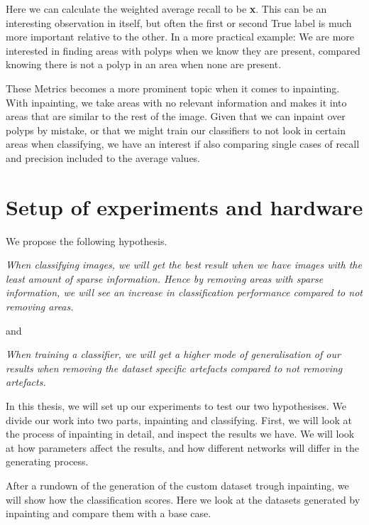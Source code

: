 Here we can calculate the weighted average recall to be \textbf{x}. This can be an interesting observation in itself, but often the first or second True label is much more important relative to the other.  In a more practical example: We are more interested in finding areas with polyps when we know they are present, compared knowing there is not a polyp in an area when none are present. 

These Metrics becomes a more prominent topic when it comes to inpainting. With inpainting, we take areas with no relevant information and makes it into areas that are similar to the rest of the image. Given that we can inpaint over polyps by mistake, or that we might train our classifiers to not look in certain areas when classifying, we have an interest if also comparing single cases of recall and precision included to the average values.






\section{Setup of experiments and hardware}
We propose the following hypothesis.
\vspace{10px}

\textit{
When classifying images, we will get the best result when we have images with the least amount of sparse information. 
Hence by removing areas with sparse information,
we will see an increase in classification performance compared to not removing areas.
}

\vspace{5px}
and

\vspace{5px}
\textit{
When training a classifier, we will get a higher
mode of generalisation of our results when removing the dataset
specific artefacts compared to not removing artefacts.}
\vspace{5px}

In this thesis, we will set up our experiments to test our two hypothesises. 
We divide our work into two parts, inpainting and classifying. 
First, we will look at the process of inpainting in detail, and inspect the results we have.  
We will look at how parameters affect the results, and how different networks will differ in the generating process. 


After a rundown of the generation of the custom dataset trough inpainting, we will show how the classification scores. Here we look at the datasets generated by inpainting and compare them with a base case. 

